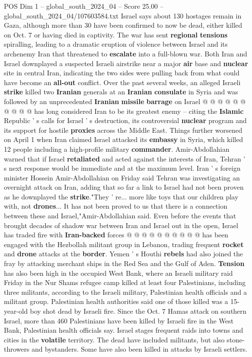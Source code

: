 \begin{textsample}{POS Dim 1 – global\_south\_2024\_04 – Score 25.00 – global\_south\_2024\_04/107603584.txt}
Israel says about 130 hostages remain in Gaza, although more than 30 have been confirmed to now be dead, either killed on Oct. 7 or having died in captivity.
The war has sent \textbf{regional} \textbf{tensions} spiralling, leading to a dramatic eruption of violence between Israel and its archenemy Iran that threatened to \textbf{escalate} into a full-blown war.
Both Iran and Israel downplayed a suspected Israeli airstrike near a major \textbf{air} base and \textbf{nuclear} site in central Iran, indicating the two sides were pulling back from what could have become an \textbf{all-out} conflict.
Over the past several weeks, an alleged Israeli \textbf{strike} killed two \textbf{Iranian} generals at an \textbf{Iranian} \textbf{consulate} in Syria and was followed by an unprecedented \textbf{Iranian} \textbf{missile} \textbf{barrage} on Israel @ @ @ @ @ @ @ @ @ @ has long considered Iran to be its greatest enemy -- citing the \textbf{Islamic} Republic ' s calls for Israel ' s destruction, its controversial \textbf{nuclear} program and its support for hostile \textbf{proxies} across the Middle East.
Things further worsened on April 1 when Iran claimed Israel attacked its \textbf{embassy} in Syria, which killed 12 people including a high-profile military \textbf{commander}.
Amir-Abdollahian warned that if Israel \textbf{retaliated} and acted against the interests of Iran, Tehran ' s next response would be immediate and at the maximum level.
Iran ' s foreign minister Hossein Amir-Abdollahian on Friday said Tehran was investigating an overnight attack on Iran, adding that so far a link to Israel had not been proven as he downplayed the \textbf{strike}."They ' re... more like toys that our children play with, not \textbf{drones}...
It has not been proved to us that there is a connection between these and Israel,"Amir-Abdollahian said.
Even before the events that brought decades of shadow war between Iran and Israel out in the open, Israel has traded fire with \textbf{Iran-backed} forces @ @ @ @ @ @ @ @ @ @ has been engaged with the Hezbollah militant group in Lebanon, trading frequent \textbf{rocket} and \textbf{drone} attacks at the \textbf{border}.
Yemen ' s Houthi \textbf{rebels} had also joined the fray by attacking merchant ships in the Red Sea and the Gulf of Aden. \textbf{Tension} has also been high in the occupied West Bank, where an Israeli military raid Friday in the Nur Shams refugee camp killed at least four Palestinians, including three militants, according to the Israeli military, Palestinian health officials and a militant group.
Palestinian health authorities said one of those killed was a 15-year-old boy shot dead by Israeli fire.
Since the Oct. 7 Hamas attack on southern Israel, more than 460 Palestinians have been killed by Israeli fire in the West Bank, Palestinian health officials say.
Israel stages frequent raids into towns and cities in the \textbf{volatile} territory.
The dead have included militants, but also stone-throwers and bystanders.
Some have also been killed in attacks by Israeli settlers.


\end{textsample}
